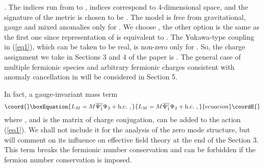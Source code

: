 \documentclass[a4paper,12pt]{article}
\begin{document}
\coordHE{}. The indices \coordHE{} run from \coordHE{} to \coordHE{},
indices \myHighlight{$\mu,\nu$}\coordHE{} correspond to 4-dimensional space, and the
signature of the metric is chosen to be \myHighlight{$(-,+,\dots,+)$}\coordHE{}. The model is
free from gravitational, gauge and mixed anomalies only for
\coordHE{}. We choose \coordHE{}, the other option \coordHE{} is
the same as the first one since \coordHE{} representation of \coordHE{} is equivalent to \coordHE{}. The Yukawa-type coupling in
(\ref{eq1}), which can be taken to be real, is non-zero only for
\coordHE{}. So, the charge assignment we take in Sections 3 and 4 of
the paper is \coordHE{}. The general case of multiple
fermionic species and arbitrary fermionic charges consistent with
anomaly cancellation in \coordHE{} will be considered in Section 5. 

In fact, a gauge-invariant mass term
\begin{equation}\coord{}\boxEquation{
L_M=M \overline{\Psi_1^c}\Psi_2 + \mbox{h.c.}~,
\label{majorana}
}{
L_M=M \overline{\Psi_1^c}\Psi_2 + \mbox{h.c.}~,
}{ecuacion}\coordE{}\end{equation}
where \coordHE{}, and \coordHE{} is the matrix of charge
conjugation, can be added to the action (\ref{eq1}). We shall not
include it for the analysis of the zero mode structure, but will
comment on its influence on effective field theory at the end of the
Section 3. This term breaks the fermionic number conservation and can
be forbidden if the fermion number conservation is imposed.
\end{document}
